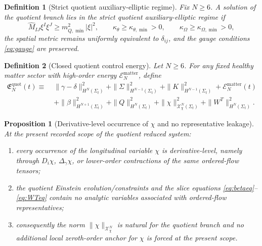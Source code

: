 \documentclass[11pt]{article}
\newtheorem{definition}{Definition}
\newtheorem{proposition}{Proposition}
\begin{document}
\begin{definition}[Strict quotient auxiliary-elliptic regime]
\label{def:strict}
Fix \(N\ge 6\). A solution of the quotient branch lies in the \emph{strict quotient auxiliary-elliptic regime} if
\begin{equation}
\widehat M_{IJ}\xi^I\xi^J\ge m_{Q,\min}^2|\xi|^2,
\qquad
\kappa_\theta\ge \kappa_{\theta,\min}>0,
\qquad
\kappa_\Omega\ge \kappa_{\Omega,\min}>0,
\label{eq:strict}
\end{equation}
the spatial metric remains uniformly equivalent to \(\delta_{ij}\), and the gauge conditions \eqref{eq:gauge} are preserved.
\end{definition}

\begin{definition}[Closed quotient control energy]
\label{def:Equot}
Let \(N\ge 6\). For any fixed healthy matter sector with high-order energy \(\mathcal E_N^{\mathrm{matter}}\), define
\begin{align}
\mathfrak E_N^{\mathrm{quot}}(t)
\equiv\;&
\|\gamma-\delta\|_{H^N(\Sigma_t)}^2
+\|\Sigma\|_{H^{N-1}(\Sigma_t)}^2
+\|K\|_{H^{N-1}(\Sigma_t)}^2
+\mathcal E_N^{\mathrm{matter}}(t)
\nonumber\\
&+\|\beta\|_{H^{N+1}(\Sigma_t)}^2
+\|Q\|_{H^N(\Sigma_t)}^2
+\|\chi\|_{\mathcal X_\chi^N(\Sigma_t)}^2
+\|W^T\|_{H^N(\Sigma_t)}^2.
\label{eq:Equot}
\end{align}
\end{definition}

\begin{proposition}[Derivative-level occurrence of \texorpdfstring{\(\chi\)}{chi} and no representative leakage]
\label{prop:derivative}
At the present recorded scope of the quotient reduced system:
\begin{enumerate}
    \item every occurrence of the longitudinal variable \(\chi\) is derivative-level, namely through \(D_i\chi\), \(\Delta_\gamma\chi\), or lower-order contractions of the same ordered-flow tensors;
    \item the quotient Einstein evolution/constraints and the slice equations \eqref{eq:betaeq}--\eqref{eq:WTeq} contain no analytic variables associated with ordered-flow representatives;
    \item consequently the norm \(\|\chi\|_{\mathcal X_\chi^N}\) is natural for the quotient branch and no additional local zeroth-order anchor for \(\chi\) is forced at the present scope.
\end{enumerate}
\end{proposition}
\end{document}
